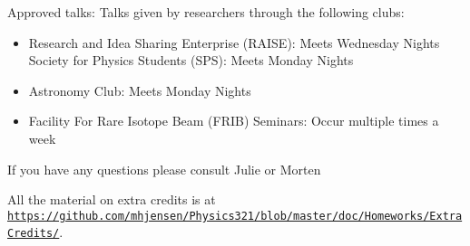 \documentclass[%
oneside,                 %
final,                   %
10pt]{article}
\begin{document}
\noindent
Approved talks:
Talks given by researchers through the following clubs:
\begin{itemize}
\item Research and Idea Sharing Enterprise (RAISE)​: Meets Wednesday Nights Society for Physics Students (SPS)​: Meets Monday Nights

\item Astronomy Club​: Meets Monday Nights

\item Facility For Rare Isotope Beam (FRIB) Seminars: ​Occur multiple times a week
\end{itemize}

\noindent
If you have any questions please consult Julie or Morten

All the material on extra credits is at \href{{https://github.com/mhjensen/Physics321/blob/master/doc/Homeworks/ExtraCredits/}}{\nolinkurl{https://github.com/mhjensen/Physics321/blob/master/doc/Homeworks/ExtraCredits/}}. 

\end{document}

